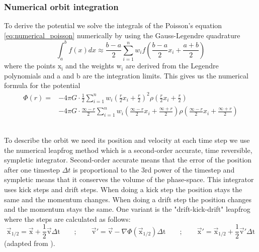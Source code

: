 \subsubsection{Numerical orbit integration}\label{sec:num_int}
To derive the potential we solve the integrals of the Poisson's equation \eqref{eq:numerical_poisson} numerically by using the Gauss-Legendre quadrature 
\begin{equation}\label{eq:Gauss-Legendre}
\int_a^b f(x)dx \approx \frac{b-a}{2}\sum_{i=1}^n w_i f\left(\frac{b-a}{2}x_i+\frac{a+b}{2}\right)
\end{equation} where the points \(\mathrm{x_i}\) and the weights \(\mathrm{w_i}\) are derived from the Legendre polynomials and a and b are the integration limits. This gives us the numerical formula for the potential 
\begin{equation}\label{eq:numerical_potential}
\begin{aligned}
\Phi(r)= & -4\pi G \cdot \frac{1}{2}\sum_{i=1}^n  w_i\left(\frac{r}{2}x_i+\frac{r}{2}\right)^2\rho\left(\frac{r}{2} x_i+ \frac{r}{2}\right) \\
&-4\pi G\cdot\frac{\infty-r}{2}\sum_{i=1}^n w_i\left(\frac{\infty-r}{2} x_i +\frac{\infty+r}{2}\right)\rho\left(\frac{\infty-r}{2} x_i +\frac{\infty+r}{2}\right)
\end{aligned}
\end{equation}
\\
\par To describe the orbit we need its position and velocity at each time step we use the numerical leapfrog method which is a second-order accurate, time reversible, sympletic integrator. Second-order accurate means that the error of the position after one timestep \(\Delta t\) is proportional to the 3rd power of the timestep and sympletic means that it conserves the volume of the phase-space. This integrator uses kick steps and drift steps.   When doing a kick step the position stays the same and the momentum changes. When doing a drift step the position changes and the momentum stays the same. One variant is the "drift-kick-drift" leapfrog where the steps are calculated as follows:
\begin{equation}
\vec{\mathrm{x}}_{1/2} = \vec{\mathrm{x}}+\frac{1}{2}  \vec{\mathrm{v}}\Delta \mathrm{t} \qquad;\qquad \vec{\mathrm{v}}'=\vec{\mathrm{v}}- \nabla\Phi(\vec{\mathrm{x}}_{1/2})\Delta\mathrm{t} \qquad ; \qquad \vec{\mathrm{x}}' = \vec{\mathrm{x}}_{1/2}+\frac{1}{2} \vec{\mathrm{v}}' \Delta \mathrm{t}
\end{equation} (adapted from \citet[eq. 3.166a]{2008gady.book.....B}).

